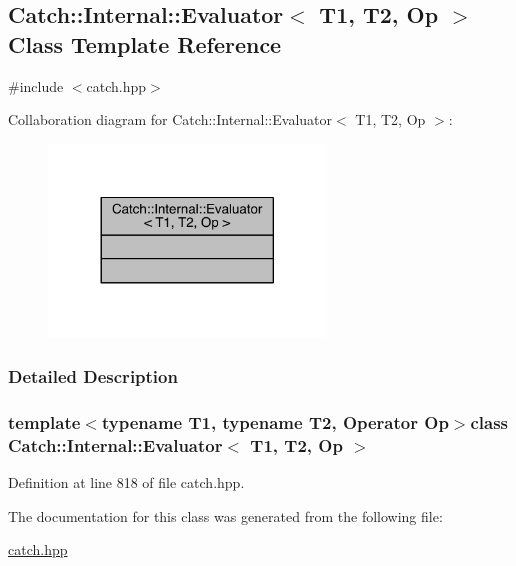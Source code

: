 \hypertarget{a00018}{}\subsection{Catch\+:\+:Internal\+:\+:Evaluator$<$ T1, T2, Op $>$ Class Template Reference}
\label{a00018}


{\ttfamily \#include $<$catch.\+hpp$>$}



Collaboration diagram for Catch\+:\+:Internal\+:\+:Evaluator$<$ T1, T2, Op $>$\+:\nopagebreak
\begin{figure}[H]
\begin{center}
\leavevmode
\includegraphics[width=209pt]{a00308}
\end{center}
\end{figure}


\subsubsection{Detailed Description}
\subsubsection*{template$<$typename T1, typename T2, Operator Op$>$class Catch\+::\+Internal\+::\+Evaluator$<$ T1, T2, Op $>$}



Definition at line 818 of file catch.\+hpp.



The documentation for this class was generated from the following file\+:\begin{DoxyCompactItemize}
\item 
\hyperlink{a00094}{catch.\+hpp}\end{DoxyCompactItemize}
